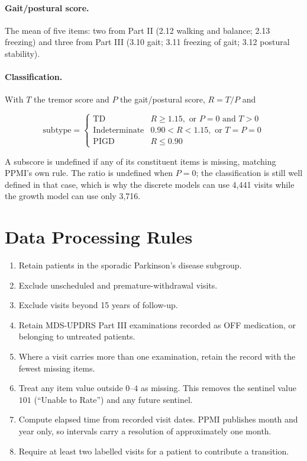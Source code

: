 \documentclass[11pt,a4paper]{article}
\begin{document}
\paragraph{Gait/postural score.} The mean of five items: two from Part II (2.12
walking and balance; 2.13 freezing) and three from Part III (3.10 gait; 3.11
freezing of gait; 3.12 postural stability).

\paragraph{Classification.} With $T$ the tremor score and $P$ the gait/postural
score, $R = T/P$ and

\[
\text{subtype} =
\begin{cases}
\text{TD}            & R \geq 1.15, \text{ or } P = 0 \text{ and } T > 0 \\
\text{Indeterminate} & 0.90 < R < 1.15, \text{ or } T = P = 0 \\
\text{PIGD}          & R \leq 0.90
\end{cases}
\]

\noindent
A subscore is undefined if any of its constituent items is missing, matching
PPMI's own rule. The ratio is undefined when $P = 0$; the classification is
still well defined in that case, which is why the discrete models can use 4{,}441
visits while the growth model can use only 3{,}716.

\section{Data Processing Rules}

\begin{enumerate}[leftmargin=2.2em]
  \item Retain patients in the sporadic Parkinson's disease subgroup.
  \item Exclude unscheduled and premature-withdrawal visits.
  \item Exclude visits beyond 15 years of follow-up.
  \item Retain MDS-UPDRS Part III examinations recorded as OFF medication, or
        belonging to untreated patients.
  \item Where a visit carries more than one examination, retain the record with
        the fewest missing items.
  \item Treat any item value outside $0$--$4$ as missing. This removes the
        sentinel value $101$ (``Unable to Rate'') and any future sentinel.
  \item Compute elapsed time from recorded visit dates. PPMI publishes month and
        year only, so intervals carry a resolution of approximately one month.
  \item Require at least two labelled visits for a patient to contribute a
        transition.
\end{enumerate}
\end{document}
